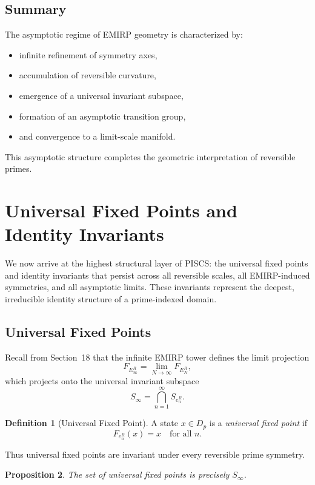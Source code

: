 \documentclass[11pt]{article}
\theoremstyle{definition}
\newtheorem{definition}{Definition}[section]
\theoremstyle{plain}
\newtheorem{proposition}[definition]{Proposition}
\theoremstyle{remark}
\begin{document}
\subsection{Summary}

The asymptotic regime of EMIRP geometry is characterized by:

\begin{itemize}
    \item infinite refinement of symmetry axes,
    \item accumulation of reversible curvature,
    \item emergence of a universal invariant subspace,
    \item formation of an asymptotic transition group,
    \item and convergence to a limit-scale manifold.
\end{itemize}

This asymptotic structure completes the geometric interpretation of
reversible primes.

\section{Universal Fixed Points and Identity Invariants}

We now arrive at the highest structural layer of PISCS: the universal
fixed points and identity invariants that persist across all reversible
scales, all EMIRP-induced symmetries, and all asymptotic limits. These
invariants represent the deepest, irreducible identity structure of a
prime-indexed domain.

\subsection{Universal Fixed Points}

Recall from Section~18 that the infinite EMIRP tower defines the limit
projection
\[
F_{E_\infty^R} = \lim_{N \to \infty} F_{E_N^R},
\]
which projects onto the universal invariant subspace
\[
S_\infty = \bigcap_{n=1}^\infty S_{e_n^R}.
\]

\begin{definition}[Universal Fixed Point]
A state $x \in D_p$ is a \emph{universal fixed point} if
\[
F_{e_n^R}(x) = x
\quad \text{for all } n.
\]
\end{definition}

Thus universal fixed points are invariant under every reversible prime
symmetry.

\begin{proposition}
The set of universal fixed points is precisely $S_\infty$.
\end{proposition}
\end{document}
